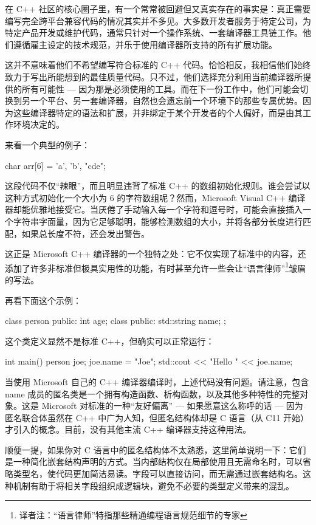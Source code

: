 在 C++ 社区的核心圈子里，有一个常常被回避但又真实存在的事实是：真正需要编写完全跨平台兼容代码的情况其实并不多见。大多数开发者服务于特定公司，为特定产品开发或维护代码，通常只针对一个操作系统、一套编译器工具链工作。他们遵循雇主设定的技术规范，并乐于使用编译器所支持的所有扩展功能。

这并不意味着他们不希望编写符合标准的 C++ 代码。恰恰相反，我相信他们始终致力于写出所能想到的最佳质量代码。只不过，他们选择充分利用当前编译器所提供的所有可能性 --- 因为那是必须使用的工具。而在下一份工作中，他们可能会切换到另一个平台、另一套编译器，自然也会遗忘前一个环境下的那些专属优势。因为这些编译器特定的语法和扩展，并非绑定于某个开发者的个人偏好，而是由其工作环境决定的。

来看一个典型的例子：

\begin{cpp}
char arr[6] = {'a', 'b', "cde"};
\end{cpp}

这段代码不仅“辣眼”，而且明显违背了标准 C++ 的数组初始化规则。谁会尝试以这种方式初始化一个大小为 6 的字符数组呢？然而，Microsoft Visual C++ 编译器却能优雅地接受它。当厌倦了手动输入每一个字符和逗号时，可能会直接插入一个字符串字面量，因为它足够聪明，能够检测数组的大小，并将各部分长度进行匹配，如果总长度不符，还会发出警告。

这正是 Microsoft C++ 编译器的一个独特之处：它不仅实现了标准中的内容，还添加了许多非标准但极具实用性的功能，有时甚至允许一些会让“语言律师”\footnote{译者注：“语言律师”特指那些精通编程语言规范细节的专家}皱眉的写法。

再看下面这个示例：

\begin{cpp}
class person {
public:
  int age;
  class {
  public:
    std::string name;
  };
}
\end{cpp}

这个类定义显然不是标准 C++，但确实可以正常运行：

\begin{cpp}
int main() {
  person joe;
  joe.name = "Joe";
  std::cout << "Hello " << joe.name;
}
\end{cpp}

当使用 Microsoft 自己的 C++ 编译器编译时，上述代码没有问题。请注意，包含 name 成员的匿名类是一个拥有构造函数、析构函数，以及其他多种特性的完整对象。这是 Microsoft 对标准的一种“友好偏离” --- 如果愿意这么称呼的话 --- 因为匿名联合体虽然在 C++ 中广为人知，但匿名结构体却是 C 语言（从 C11 开始）才引入的概念。目前，没有其他主流 C++ 编译器支持这种用法。

顺便一提，如果你对 C 语言中的匿名结构体不太熟悉，这里简单说明一下：它们是一种简化嵌套结构声明的方式。当内部结构仅在局部使用且无需命名时，可以省略类型名，使代码更加简洁易读。字段可以直接访问，而无需通过嵌套结构名。这种机制有助于将相关字段组织成逻辑块，避免不必要的类型定义带来的混乱。




